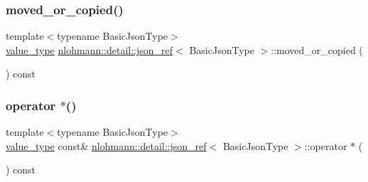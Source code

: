 \subsubsection{\texorpdfstring{moved\_or\_copied()}{moved\_or\_copied()}}
{\footnotesize\ttfamily template$<$typename Basic\+Json\+Type$>$ \\
\mbox{\hyperlink{classnlohmann_1_1detail_1_1json__ref_a78d76cf288141049568c0d670ed670ef}{value\+\_\+type}} \mbox{\hyperlink{classnlohmann_1_1detail_1_1json__ref}{nlohmann\+::detail\+::json\+\_\+ref}}$<$ Basic\+Json\+Type $>$\+::moved\+\_\+or\+\_\+copied (\begin{DoxyParamCaption}{ }\end{DoxyParamCaption}) const\hspace{0.3cm}{\ttfamily [inline]}}

\mbox{\label{classnlohmann_1_1detail_1_1json__ref_af96699d7e27c3b1f9d778fe142f8bb41}} 
\subsubsection{\texorpdfstring{operator $\ast$()}{operator *()}}
{\footnotesize\ttfamily template$<$typename Basic\+Json\+Type$>$ \\
\mbox{\hyperlink{classnlohmann_1_1detail_1_1json__ref_a78d76cf288141049568c0d670ed670ef}{value\+\_\+type}} const\& \mbox{\hyperlink{classnlohmann_1_1detail_1_1json__ref}{nlohmann\+::detail\+::json\+\_\+ref}}$<$ Basic\+Json\+Type $>$\+::operator $\ast$ (\begin{DoxyParamCaption}{ }\end{DoxyParamCaption}) const\hspace{0.3cm}{\ttfamily [inline]}}

\mbox{\label{classnlohmann_1_1detail_1_1json__ref_adb652774a67829876449dc0b30637456}} 
